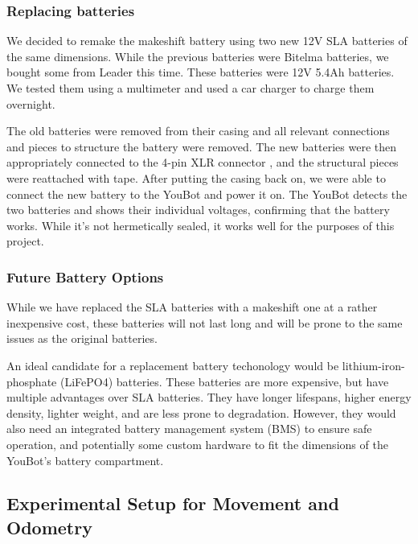 \documentclass[a4paper, 12pt]{article}
\newif\ifshownotes
\newcommand{\notes}[1]{\ifshownotes\textcolor{blue}{#1}\fi}
\begin{document}
    \subsubsection{Replacing batteries}

    \notes{maybe here we can link to the specific batteries used? the dimensions would be neat as well...}

    We decided to remake the makeshift battery using two new 12V SLA batteries of the same dimensions. While the previous batteries were Bitelma batteries, we bought some from Leader this time. These batteries were 12V 5.4Ah batteries. We tested them using a multimeter and used a car charger to charge them overnight. 
    
    The old batteries were removed from their casing and all relevant connections and pieces to structure the battery were removed. The new batteries were then appropriately connected to the 4-pin XLR connector \notes{maybe mention the pinout here?}, and the structural pieces were reattached with tape. After putting the casing back on, we were able to connect the new battery to the YouBot and power it on. The YouBot detects the two batteries and shows their individual voltages, confirming that the battery works. While it's not hermetically sealed, it works well for the purposes of this project. 

    \subsubsection{Future Battery Options}

    While we have replaced the SLA batteries with a makeshift one at a rather inexpensive cost, these batteries will not last long and will be prone to the same issues as the original batteries. 

    An ideal candidate for a replacement battery techonology would be lithium-iron-phosphate (LiFePO4) batteries. These batteries are more expensive, but have multiple advantages over SLA batteries. They have longer lifespans, higher energy density, lighter weight, and are less prone to degradation. However, they would also need an integrated battery management system (BMS) to ensure safe operation, and potentially some custom hardware to fit the dimensions of the YouBot's battery compartment. 

    
    \subsection{Experimental Setup for Movement and Odometry}
\end{document}
